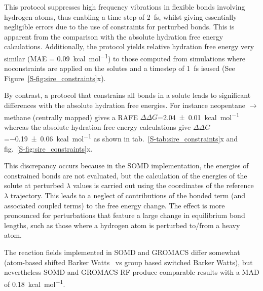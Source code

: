 \documentclass[journal=jctcce,manuscript=article]{achemso}
\begin{document}
This protocol suppresses high frequency vibrations in flexible bonds involving hydrogen atoms, thus enabling a time 
step of \SI{2}{fs}, whilst giving essentially negligible errors due to the use of constraints for perturbed bonds.  This is apparent from the comparison with the absolute hydration free energy calculations.  Additionally, the protocol 
yields relative hydration free energy very similar  (MAE = 
\SI{0.09}{kcal.mol^{-1}}) to those computed from simulations where noconstraints are applied on the solutes and a timestep of \SI{1}{fs} isused (See Figure~\ref{S-fig:sire_constraints}x).

By contrast, a protocol that constrains all bonds in a solute leads to 
significant differences with the absolute hydration free energies. For instance 
neopentane $\rightarrow$ methane (centrally mapped) gives a RAFE
$\Delta\Delta G$=\SI{2.04 +- 0.01}{kcal.mol^{-1}}  whereas the absolute 
hydration free energy calculations give $\Delta\Delta 
G$=\SI{-0.19+-0.06}{kcal.mol^{-1}} as shown in 
tab.~\ref{S-tab:sire_constraints}x and fig.~\ref{S-fig:sire_constraints}x.

This discrepancy occurs because in the SOMD implementation, the energies of constrained bonds are not evaluated, but the calculation of the energies of the solute at perturbed $\lambda$ values is carried out using the coordinates of the reference $\lambda$ trajectory. This leads to a neglect of contributions of 
the bonded term (and associated coupled terms) to the free energy change. The effect is more pronounced for perturbations that feature a large change in equilibrium bond lengths, such as those where a hydrogen atom is perturbed 
to/from a heavy atom. 

%
The reaction fields implemented in SOMD and GROMACS differ somewhat (atom-based 
shifted Barker Watts~\cite{doi:10.1080/00268977300102101} vs group based 
switched Barker Watts), but nevertheless SOMD and GROMACS RF produce comparable results with a MAD of \SI{0.18}{kcal.mol^{-1}}.
\end{document}
